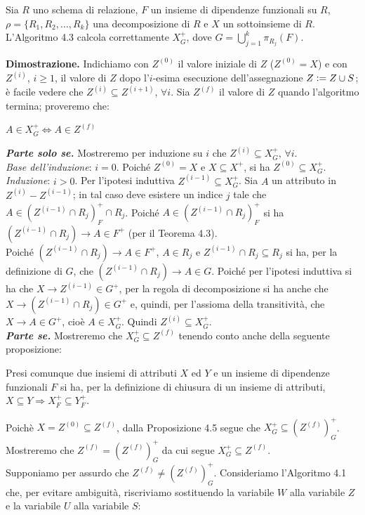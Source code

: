 \begin{theo}
Sia $R$ uno schema di relazione, $F$ un insieme di dipendenze funzionali su $R$, $\rho =\{R_1, R_2, \ldots, R_k\}$
una decomposizione di $R$ e $X$ un sottoinsieme di $R$. L'Algoritmo 4.3 calcola correttamente $X^{+}_G$, dove 
$G = \bigcup_{j=1}^k \pi_{R_j}(F)$.
\end{theo}
\textbf{Dimostrazione.} Indichiamo con $Z^{(0)}$ il valore iniziale di $Z$ ($Z^{(0)} = X$) e con $Z^{(i)}$, $i \geq 
1$, il valore di $Z$ dopo l'$i$-esima esecuzione dell'assegnazione $Z \vcentcolon= Z \cup S$; è facile vedere che 
$Z^{(i)} \subseteq Z^{(i+1)}$, $\forall i$. Sia $Z^{(f)}$ il valore di $Z$ quando l'algoritmo termina; proveremo che:
\begin{center}
\begin{math}
  A \in X^{+}_G \Leftrightarrow  A \in Z^{(f)} 
\end{math}
\end{center}
\textbf{\emph{Parte solo se.}} Mostreremo per induzione su $i$ che $Z^{(i)} \subseteq X^{+}_G$, $\forall i$.\\
\emph{Base dell'induzione}: $i=0$. Poiché $Z^{(0)} = X$ e $X \subseteq X^+$, si ha $Z^{(0)} \subseteq X^{+}_G$.\\
\emph{Induzione}: $i >0$. Per l'ipotesi induttiva $Z^{(i-1)} \subseteq X^{+}_G$. Sia $A$ un attributo in $Z^{(i)}
-Z^{(i-1)}$; in tal caso deve esistere un indice $j$ tale che $A \in (Z^{(i-1)} \cap R_j)^{+}_F \cap R_j$. Poiché
$A \in (Z^{(i-1)} \cap R_j)^{+}_F$ si ha $(Z^{(i-1)} \cap R_j) \rightarrow A \in F^+$ (per il Teorema 4.3).\\
Poiché $(Z^{(i-1)} \cap R_j) \rightarrow A \in F^+$, $A \in R_j$ e $Z^{(i-1)} \cap R_j \subseteq R_j$ si ha, per 
la definizione di $G$, che $(Z^{(i-1)} \cap R_j) \rightarrow A \in G$. Poiché per l'ipotesi induttiva si ha che 
$X \rightarrow Z^{(i-1)} \in G^+$, per la regola di decomposizione si ha anche che $X \rightarrow (Z^{(i-1)} 
\cap R_j) \in G^+$ e, quindi, per l'assioma della transitività, che $X \rightarrow A \in G^+$, cioè $A \in X^{+}_G$.
Quindi $Z^{(i)} \subseteq X^{+}_G$.\\
\textbf{\emph{Parte se.}} Mostreremo che $X^{+}_G \subseteq Z^{(f)}$ tenendo conto anche della seguente proposizione:
\begin{prop}
Presi comunque due insiemi di attributi $X$ ed $Y$ e un insieme di dipendenze funzionali $F$ si ha, per la 
definizione di chiusura di un insieme di attributi, $X \subseteq Y \Rightarrow X^{+}_F \subseteq Y^{+}_F$. 
\end{prop}
Poichè $X = Z^{(0)} \subseteq Z^{(f)}$, dalla Proposizione 4.5 segue che $X^{+}_G \subseteq (Z^{(f)})^{+}_G$. 
Mostreremo che $Z^{(f)} = (Z^{(f)})^+_G$ da cui segue $X^+_G \subseteq Z^{(f)}.$\\
Supponiamo per assurdo che $Z^{(f)}\not =(Z^{(f)})^+_G$. Consideriamo l'Algoritmo 4.1 che, per evitare ambiguità,
riscriviamo sostituendo la variabile $W$ alla variabile $Z$ e la variabile $U$ alla variabile $S$:\\

